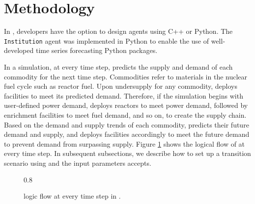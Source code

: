 \section{Methodology}
In \Cyclus, developers have the option to design 
agents using C++ or Python. 
The \deploy \texttt{Institution} agent was 
implemented in Python to enable the use of 
well-developed time series forecasting Python packages. 

In a \Cyclus simulation, at every time step, \deploy 
predicts the supply and demand of each commodity for the next time 
step. 
Commodities refer to materials in the nuclear fuel cycle such as 
reactor fuel. 
Upon undersupply for any commodity, 
\deploy deploys facilities to meet its predicted demand.
Therefore, if the simulation begins with user-defined power 
demand, \deploy deploys reactors to meet power demand, 
followed by enrichment facilities to meet fuel demand, and so on,
to create the supply chain.
Based on the demand and supply trends of each commodity, 
\deploy predicts their 
future demand and supply, and deploys facilities 
accordingly to meet the future demand to prevent demand 
from surpassing supply. 
Figure \ref{fig:flow} shows the logical flow of \deploy 
at every time step. 
In subsequent subsections, we describe how to set up a 
transition scenario using \deploy and the input parameters 
\deploy accepts. 

\begin{figure}[]
	\centering
	 {0.8\height}{
	}
    \caption{\deploy logic flow at every time step in \Cyclus \cite{chee_demonstration_2019}.}
    \label{fig:flow}
\end{figure}

